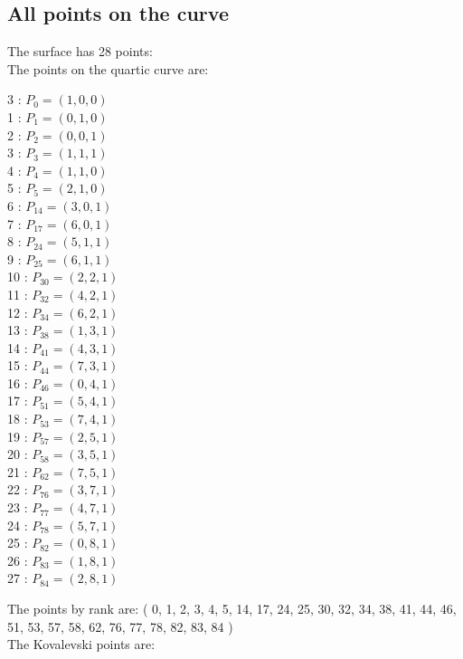 \subsection*{All points on the curve}
The surface has 28 points:\\
The points on the quartic curve are:\\
\begin{multicols}{3}
 : $P_{0}=( 1, 0, 0 )$\\
1 : $P_{1}=( 0, 1, 0 )$\\
2 : $P_{2}=( 0, 0, 1 )$\\
3 : $P_{3}=( 1, 1, 1 )$\\
4 : $P_{4}=( 1, 1, 0 )$\\
5 : $P_{5}=( 2, 1, 0 )$\\
6 : $P_{14}=( 3, 0, 1 )$\\
7 : $P_{17}=( 6, 0, 1 )$\\
8 : $P_{24}=( 5, 1, 1 )$\\
9 : $P_{25}=( 6, 1, 1 )$\\
10 : $P_{30}=( 2, 2, 1 )$\\
11 : $P_{32}=( 4, 2, 1 )$\\
12 : $P_{34}=( 6, 2, 1 )$\\
13 : $P_{38}=( 1, 3, 1 )$\\
14 : $P_{41}=( 4, 3, 1 )$\\
15 : $P_{44}=( 7, 3, 1 )$\\
16 : $P_{46}=( 0, 4, 1 )$\\
17 : $P_{51}=( 5, 4, 1 )$\\
18 : $P_{53}=( 7, 4, 1 )$\\
19 : $P_{57}=( 2, 5, 1 )$\\
20 : $P_{58}=( 3, 5, 1 )$\\
21 : $P_{62}=( 7, 5, 1 )$\\
22 : $P_{76}=( 3, 7, 1 )$\\
23 : $P_{77}=( 4, 7, 1 )$\\
24 : $P_{78}=( 5, 7, 1 )$\\
25 : $P_{82}=( 0, 8, 1 )$\\
26 : $P_{83}=( 1, 8, 1 )$\\
27 : $P_{84}=( 2, 8, 1 )$\\
\end{multicols}
The points by rank are: 
( 0, 1, 2, 3, 4, 5, 14, 17, 24, 25, 30, 32, 34, 38, 41, 44, 46, 51, 53, 57, 58, 62, 76, 77, 78, 82, 83, 84 )\\
The Kovalevski points are: \\
